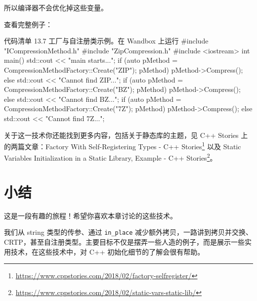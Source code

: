 所以编译器不会优化掉这些变量。

查看完整例子：

\begin{codeboxt}[cpp]{代码清单 13.7 工厂与自注册类示例。在 Wandbox 上运行}
#include "ICompressionMethod.h"
#include "ZipCompression.h"
#include <iostream>
int main() {
std::cout << "main starts...\n";
if (auto pMethod = CompressionMethodFactory::Create("ZIP"); pMethod)
pMethod->Compress();
else
std::cout << "Cannot find ZIP...\n";
if (auto pMethod = CompressionMethodFactory::Create("BZ"); pMethod)
pMethod->Compress();
else
std::cout << "Cannot find BZ...\n";
if (auto pMethod = CompressionMethodFactory::Create("7Z"); pMethod)
pMethod->Compress();
else
std::cout << "Cannot find 7Z...\n";
}
\end{codeboxt}

\begin{myInfoBox}
关于这一技术你还能找到更多内容，包括关于静态库的主题，见 C++ Stories 上的两篇文章：Factory With Self-Registering Types - C++ Stories\footnote{\url{https://www.cppstories.com/2018/02/factory-selfregister/}} 以及 Static Variables Initialization in a Static Library, Example - C++ Stories\footnote{\url{https://www.cppstories.com/2018/02/static-vars-static-lib/}}。
\end{myInfoBox}

\section{小结}

这是一段有趣的旅程！希望你喜欢本章讨论的这些技术。

我们从 string 类型的传参、通过 \texttt{in\_place} 减少额外拷贝，一路讲到拷贝并交换、CRTP，甚至自注册类型。主要目标不仅是摆弄一些人造的例子，而是展示一些实用技术，在这些技术中，对 C++ 初始化细节的了解会很有帮助。

